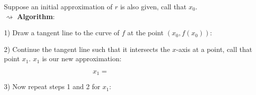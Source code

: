 Suppose an initial approximation of $r$ is also given, call that $x_0$.\\

$\rightsquigarrow$ \textbf{Algorithm}:

1) Draw a tangent line to the curve of $f$ at the point $(x_0, f(x_0))$:


\vspace{3cm}

2) Continue the tangent line such that it intersects the $x$-axis at a point, call that point $x_1$. $x_1$ is our new approximation:


\vspace{1cm}
\[
	x_{1} = \qquad \qquad \qquad \qquad
\]
\vspace{1cm}

3) Now repeat steps 1 and 2 for $x_1$:

